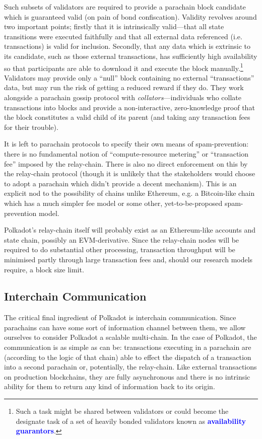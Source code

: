 \documentclass[t,usepdftitle=false]{beamer}
\makeatletter
\newcommand*\eg{e.g.\@\xspace}
\renewcommand{\textit}[1]{\textcolor{blue}{\textbf{#1}}}
\makeatother
\begin{document}
\begin{frame}
 Such subsets of validators are required to provide a parachain block candidate which is guaranteed valid (on pain of bond confiscation). Validity revolves around two important points; firstly that it is intrinsically valid---that all state transitions were executed faithfully and that all external data referenced (i.e. transactions) is valid for inclusion. Secondly, that any data which is extrinsic to its candidate, such as those external transactions, has sufficiently high availability so that participants are able to download it and execute the block manually.\footnote{Such a task might be shared between validators or could become the designate task of a set of heavily bonded validators known as \textit{availability guarantors}.} Validators may provide only a ``null'' block containing no external ``transactions'' data, but may run the risk of getting a reduced reward if they do. They work alongside a parachain gossip protocol with \emph{collators}---individuals who collate transactions into blocks and provide a non-interactive, zero-knowledge proof that the block constitutes a valid child of its parent (and taking any transaction fees for their trouble).

 It is left to parachain protocols to specify their own means of spam-prevention: there is no fundamental notion of ``compute-resource metering'' or ``transaction fee'' imposed by the relay-chain. There is also no direct enforcement on this by the relay-chain protocol (though it is unlikely that the stakeholders would choose to adopt a parachain which didn't provide a decent mechanism). This is an explicit nod to the possibility of chains unlike Ethereum, \eg a Bitcoin-like chain which has a much simpler fee model or some other, yet-to-be-proposed spam-prevention model.

 Polkadot's relay-chain itself will probably exist as an Ethereum-like accounts and state chain, possibly an EVM-derivative. Since the relay-chain nodes will be required to do substantial other processing, transaction throughput will be minimised partly through large transaction fees and, should our research models require, a block size limit.

\subsection{Interchain Communication}
\label{interchain-communication}

 The critical final ingredient of Polkadot is interchain communication. Since parachains can have some sort of information channel between them, we allow ourselves to consider Polkadot a scalable multi-chain. In the case of Polkadot, the communication is as simple as can be: transactions executing in a parachain are (according to the logic of that chain) able to effect the dispatch of a transaction into a second parachain or, potentially, the relay-chain. Like external transactions on production blockchains, they are fully asynchronous and there is no intrinsic ability for them to return any kind of information back to its origin.


\end{frame}
\end{document}
